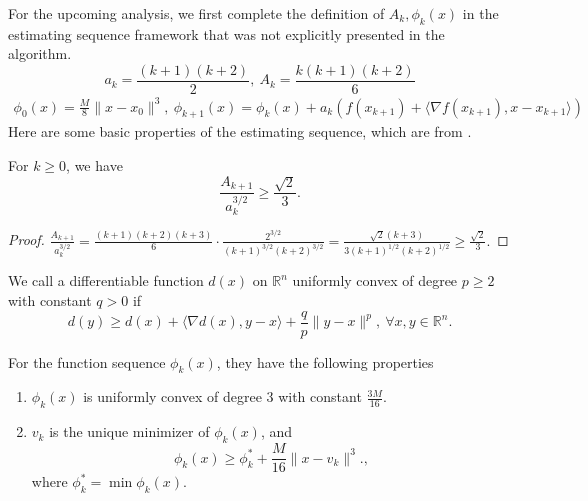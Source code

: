 \documentclass{mcom-l}
\numberwithin{equation}{section}
\begin{document}
For the upcoming analysis, we first complete the definition of $A_k,\phi_k(x)$ in the estimating sequence framework that was not explicitly presented in the algorithm.
\begin{equation}
    \label{eq.update a and A}
    a_k = \frac{(k+1)(k+2)}{2}, \ A_k=\frac{k(k+1)(k+2)}{6}
\end{equation}
\begin{align}\label{eq.update phi}
    \phi_0(x) = \frac{M}{8}\|x-x_0\|^3, \ \phi_{k+1}(x) =\phi_k(x)+a_k\left (f(x_{k+1})+\langle \nabla f(x_{k+1}),x-x_{k+1}\rangle \right )
\end{align}
Here are some basic properties of the estimating sequence, which are from \citet{nesterov_lectures_2018}.
\begin{lemma}
    \label{lem.magnitude a and A}
    For $k\geq 0$, we have
    \begin{equation}
        \label{eq.magnitude a and A}
        \frac{A_{k+1}}{a_k^{3/2}} \geq \frac{\sqrt{2}}{3}.
    \end{equation}
\end{lemma}
\begin{proof}
    $\frac{A_{k+1}}{a_k^{3/2}}= \frac{(k+1)(k+2)(k+3)}{6}\cdot \frac{2^{3/2}}{(k+1)^{3/2}(k+2)^{3/2}} = \frac{\sqrt{2}(k+3)}{3(k+1)^{1/2}(k+2)^{1/2}} \geq \frac{\sqrt{2}}{3}.$
\end{proof}
We call a differentiable function $d(x)$ on $\mathbb{R}^n$ uniformly convex \citet[Section 4.2.2]{nesterov_lectures_2018} of degree $p\geq 2$ with constant $q>0$ if
\begin{equation}
    \label{eq.uniformly convex of p}
    d(y)\geq d(x)+\langle \nabla d(x),y-x\rangle +\frac{q}{p}\|y-x\|^p, \ \forall x,y\in\mathbb{R}^n.
\end{equation}
\begin{lemma}
    \label{lem.property of phi}
    For the function sequence $\phi_k(x)$, they have the following properties
    \begin{enumerate}
        \item $\phi_k(x)$ is uniformly convex of degree $3$ with constant $\frac{3M}{16}$.
        \item $v_k$ is the unique minimizer of $\phi_k(x)$, and
              \begin{equation}
                  \label{eq.phi_k phi_low}
                  \phi_k(x)\geq \phi_k^* + \frac{M}{16}\|x-v_k\|^3.,
              \end{equation}
              where $\phi_k^* =\min \phi_k(x).$
    \end{enumerate}
\end{lemma}
\end{document}
